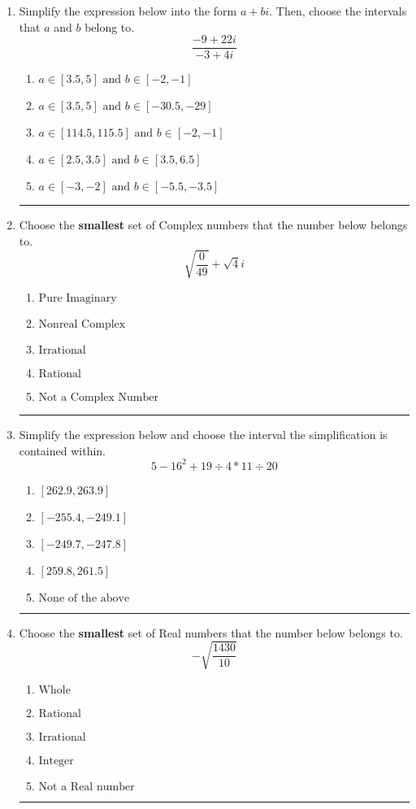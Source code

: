 \documentclass[14pt]{extbook}
\newcommand{\litem}[1]{\item#1\hspace*{-1cm}\rule{\textwidth}{0.4pt}}
\begin{document}
\begin{enumerate}
{\begin{enumerate}[label=\Alph*.]
\end{enumerate} }
\litem{
Simplify the expression below into the form $a+bi$. Then, choose the intervals that $a$ and $b$ belong to.\[ \frac{-9 + 22 i}{-3 + 4 i} \]\begin{enumerate}[label=\Alph*.]
\item \( a \in [3.5, 5] \text{ and } b \in [-2, -1] \)
\item \( a \in [3.5, 5] \text{ and } b \in [-30.5, -29] \)
\item \( a \in [114.5, 115.5] \text{ and } b \in [-2, -1] \)
\item \( a \in [2.5, 3.5] \text{ and } b \in [3.5, 6.5] \)
\item \( a \in [-3, -2] \text{ and } b \in [-5.5, -3.5] \)

\end{enumerate} }
\litem{
Choose the \textbf{smallest} set of Complex numbers that the number below belongs to.\[ \sqrt{\frac{0}{49}}+\sqrt{4}i \]\begin{enumerate}[label=\Alph*.]
\item \( \text{Pure Imaginary} \)
\item \( \text{Nonreal Complex} \)
\item \( \text{Irrational} \)
\item \( \text{Rational} \)
\item \( \text{Not a Complex Number} \)

\end{enumerate} }
\litem{
Simplify the expression below and choose the interval the simplification is contained within.\[ 5 - 16^2 + 19 \div 4 * 11 \div 20 \]\begin{enumerate}[label=\Alph*.]
\item \( [262.9, 263.9] \)
\item \( [-255.4, -249.1] \)
\item \( [-249.7, -247.8] \)
\item \( [259.8, 261.5] \)
\item \( \text{None of the above} \)

\end{enumerate} }
\litem{
Choose the \textbf{smallest} set of Real numbers that the number below belongs to.\[ -\sqrt{\frac{1430}{10}} \]\begin{enumerate}[label=\Alph*.]
\item \( \text{Whole} \)
\item \( \text{Rational} \)
\item \( \text{Irrational} \)
\item \( \text{Integer} \)
\item \( \text{Not a Real number} \)


\end{enumerate}}
\end{enumerate}
\end{document}
